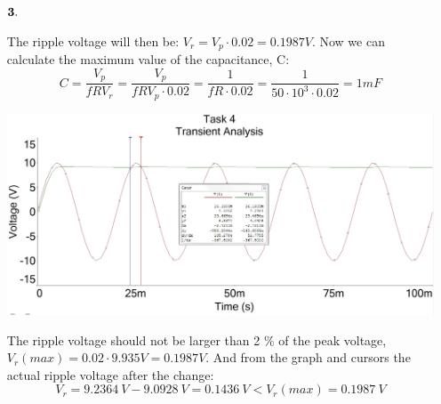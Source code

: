 \documentclass[11pt,a4paper]{article}
\begin{document}
\begin{enumerate}
  \item[$\bold{3.}$]
  
  	The ripple voltage will then be: $V_r = V_p \cdot 0.02 = 0.1987 V$. Now we can calculate the maximum value of the capacitance, C: $$ C = \dfrac{V_p}{f R V_r} = \dfrac{V_p}{f R V_p \cdot 0.02} = \dfrac{1}{f R \cdot 0.02} = \dfrac{1}{50 \cdot 10^3 \cdot 0.02} = 1mF $$
  
  \begin{minipage}{\linewidth}
    	\centering
        \includegraphics[width=13cm]{4_4.jpg}
  \end{minipage}
    
   The ripple voltage should not be larger than 2 $\%$ of the peak voltage, $V_r(max) = 0.02 \cdot 9.935 V = 0.1987 V$. And from the graph and cursors the actual ripple voltage after the change: $$ V_r = 9.2364 \: V - 9.0928 \: V = 0.1436 \: V < V_r(max) = 0.1987 \: V$$
   

\end{enumerate}
\end{document}
